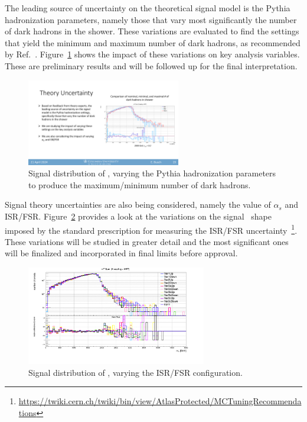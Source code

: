 The leading source of uncertainty on the theoretical signal model is the Pythia hadronization parameters, namely those that vary most significantly the number of dark hadrons in the shower.
These variations are evaluated to find the settings that yield the minimum and maximum number of dark hadrons, as recommended by Ref.~\cite{darkshowers_hadUncertainty}.
Figure~\ref{fig:pythiaHad} shows the impact of these variations on key analysis variables. 
These are preliminary results and will be followed up for the final interpretation.
\begin{figure}[!htbp]
\centering
   \includegraphics[width=0.6\textwidth]{figures/systs/pythiaHad_mT}
    \caption{Signal distribution of \mt, varying the Pythia hadronization parameters to produce the maximum/minimum number of dark hadrons.
    \label{fig:pythiaHad}}
\end{figure}

Signal theory uncertainties are also being considered, namely the value of $\alpha_s$ and ISR/FSR. 
Figure~\ref{fig:isrfsr} provides a look at the variations on the signal \mt~shape imposed by the standard prescription for measuring the ISR/FSR uncertainty~\footnote{\url{https://twiki.cern.ch/twiki/bin/view/AtlasProtected/MCTuningRecommendations}}.
These variations will be studied in greater detail and the most significant ones will be finalized and incorporated in final limits before approval.
\begin{figure}[!htbp]
\centering
   \includegraphics[width=0.7\textwidth]{figures/systs/isrfsr}
    \caption{Signal distribution of \mt, varying the ISR/FSR configuration.
    \label{fig:isrfsr}}
\end{figure}



\clearpage
